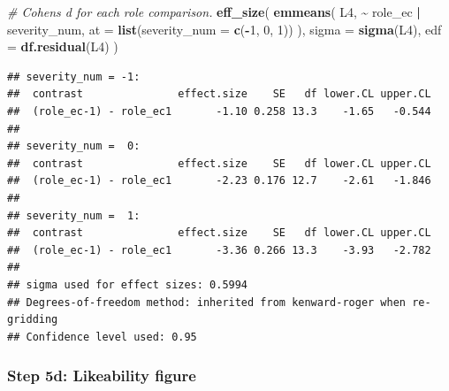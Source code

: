 \documentclass[
]{article}
\newenvironment{Shaded}{\begin{snugshade}}{\end{snugshade}}
\newcommand{\AttributeTok}[1]{\textcolor[rgb]{0.13,0.29,0.53}{#1}}
\newcommand{\CommentTok}[1]{\textcolor[rgb]{0.56,0.35,0.01}{\textit{#1}}}
\newcommand{\DecValTok}[1]{\textcolor[rgb]{0.00,0.00,0.81}{#1}}
\newcommand{\FunctionTok}[1]{\textcolor[rgb]{0.13,0.29,0.53}{\textbf{#1}}}
\newcommand{\NormalTok}[1]{#1}
\newcommand{\SpecialCharTok}[1]{\textcolor[rgb]{0.81,0.36,0.00}{\textbf{#1}}}
\begin{document}
\begin{Shaded}
\begin{Highlighting}[]
\CommentTok{\# Cohen\textquotesingle{}s d for each role comparison.}
\FunctionTok{eff\_size}\NormalTok{(}
  \FunctionTok{emmeans}\NormalTok{(}
\NormalTok{    L4,}
    \SpecialCharTok{\textasciitilde{}}\NormalTok{ role\_ec }\SpecialCharTok{|}\NormalTok{ severity\_num,}
    \AttributeTok{at =} \FunctionTok{list}\NormalTok{(}\AttributeTok{severity\_num =} \FunctionTok{c}\NormalTok{(}\SpecialCharTok{{-}}\DecValTok{1}\NormalTok{, }\DecValTok{0}\NormalTok{, }\DecValTok{1}\NormalTok{))}
\NormalTok{  ),}
  \AttributeTok{sigma =} \FunctionTok{sigma}\NormalTok{(L4),}
  \AttributeTok{edf =} \FunctionTok{df.residual}\NormalTok{(L4)}
\NormalTok{)}
\end{Highlighting}
\end{Shaded}

\begin{verbatim}
## severity_num = -1:
##  contrast               effect.size    SE   df lower.CL upper.CL
##  (role_ec-1) - role_ec1       -1.10 0.258 13.3    -1.65   -0.544
## 
## severity_num =  0:
##  contrast               effect.size    SE   df lower.CL upper.CL
##  (role_ec-1) - role_ec1       -2.23 0.176 12.7    -2.61   -1.846
## 
## severity_num =  1:
##  contrast               effect.size    SE   df lower.CL upper.CL
##  (role_ec-1) - role_ec1       -3.36 0.266 13.3    -3.93   -2.782
## 
## sigma used for effect sizes: 0.5994 
## Degrees-of-freedom method: inherited from kenward-roger when re-gridding 
## Confidence level used: 0.95
\end{verbatim}

\subsubsection{Step 5d: Likeability
figure}\label{step-5d-likeability-figure}
\end{document}
